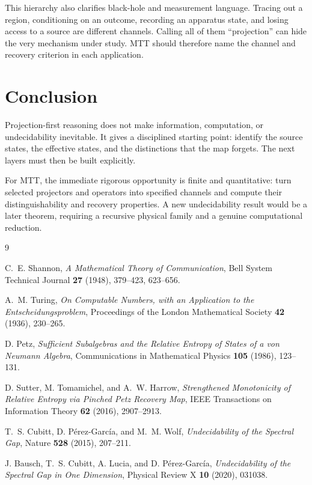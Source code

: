 \documentclass[11pt]{article}
\begin{document}
This hierarchy also clarifies black-hole and measurement language.
Tracing out a region, conditioning on an outcome, recording an apparatus
state, and losing access to a source are different channels. Calling all of
them ``projection'' can hide the very mechanism under study. MTT should
therefore name the channel and recovery criterion in each application.

\section{Conclusion}

Projection-first reasoning does not make information, computation, or
undecidability inevitable. It gives a disciplined starting point: identify
the source states, the effective states, and the distinctions that the map
forgets. The next layers must then be built explicitly.

For MTT, the immediate rigorous opportunity is finite and quantitative:
turn selected projectors and operators into specified channels and compute
their distinguishability and recovery properties. A new undecidability
result would be a later theorem, requiring a recursive physical family and
a genuine computational reduction.

\begin{thebibliography}{9}

C.~E. Shannon,
\emph{A Mathematical Theory of Communication},
Bell System Technical Journal \textbf{27} (1948), 379--423, 623--656.

A.~M. Turing,
\emph{On Computable Numbers, with an Application to the
Entscheidungsproblem},
Proceedings of the London Mathematical Society \textbf{42} (1936),
230--265.

D. Petz,
\emph{Sufficient Subalgebras and the Relative Entropy of States of a von
Neumann Algebra},
Communications in Mathematical Physics \textbf{105} (1986), 123--131.

D. Sutter, M. Tomamichel, and A.~W. Harrow,
\emph{Strengthened Monotonicity of Relative Entropy via Pinched Petz
Recovery Map},
IEEE Transactions on Information Theory \textbf{62} (2016), 2907--2913.

T.~S. Cubitt, D. P\'erez-Garc\'ia, and M.~M. Wolf,
\emph{Undecidability of the Spectral Gap},
Nature \textbf{528} (2015), 207--211.

J. Bausch, T.~S. Cubitt, A. Lucia, and D. P\'erez-Garc\'ia,
\emph{Undecidability of the Spectral Gap in One Dimension},
Physical Review X \textbf{10} (2020), 031038.

\end{thebibliography}
\end{document}
